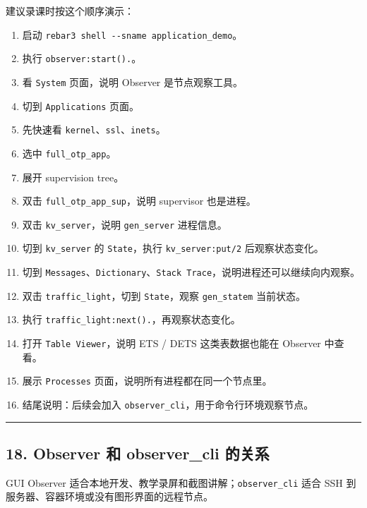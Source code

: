 建议录课时按这个顺序演示：

\begin{enumerate}
\def\labelenumi{\arabic{enumi}.}
\tightlist
\item
  启动 \texttt{rebar3\ shell\ -\/-sname\ application\_demo}。
\item
  执行 \texttt{observer:start().}。
\item
  看 \texttt{System} 页面，说明 Observer 是节点观察工具。
\item
  切到 \texttt{Applications} 页面。
\item
  先快速看 \texttt{kernel}、\texttt{ssl}、\texttt{inets}。
\item
  选中 \texttt{full\_otp\_app}。
\item
  展开 supervision tree。
\item
  双击 \texttt{full\_otp\_app\_sup}，说明 supervisor 也是进程。
\item
  双击 \texttt{kv\_server}，说明 \texttt{gen\_server} 进程信息。
\item
  切到 \texttt{kv\_server} 的 \texttt{State}，执行
  \texttt{kv\_server:put/2} 后观察状态变化。
\item
  切到
  \texttt{Messages}、\texttt{Dictionary}、\texttt{Stack\ Trace}，说明进程还可以继续向内观察。
\item
  双击 \texttt{traffic\_light}，切到 \texttt{State}，观察
  \texttt{gen\_statem} 当前状态。
\item
  执行 \texttt{traffic\_light:next().}，再观察状态变化。
\item
  打开 \texttt{Table\ Viewer}，说明 ETS / DETS 这类表数据也能在 Observer
  中查看。
\item
  展示 \texttt{Processes} 页面，说明所有进程都在同一个节点里。
\item
  结尾说明：后续会加入 \texttt{observer\_cli}，用于命令行环境观察节点。
\end{enumerate}

\begin{center}\rule{0.5\linewidth}{0.5pt}\end{center}

\subsection{18. Observer 和 observer\_cli
的关系}\label{observer-ux548c-observer_cli-ux7684ux5173ux7cfb}

GUI Observer 适合本地开发、教学录屏和截图讲解；\texttt{observer\_cli}
适合 SSH 到服务器、容器环境或没有图形界面的远程节点。

